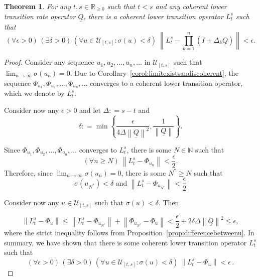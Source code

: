 \documentclass[10pt]{paper}
\newtheorem{theorem}{Theorem}
\newcommand{\nats}{\mathbb{N}}
\newcommand{\reals}{\mathbb{R}}
\newcommand{\realsnonneg}{\reals_{\geq 0}}
\newcommand{\lbound}{L}
\newcommand{\lrate}{\underline{Q}}
\newcommand{\norm}[1]{\left\lVert #1 \right\rVert}
\newcommand{\coloneqq}{:\!=}
\begin{document}
\begin{theorem}\label{theo:convergencelowerbound}
For any $t,s\in\realsnonneg$ such that $t<s$ and any coherent lower transition rate operator $\lrate$, there is a coherent lower transition operator $\lbound_t^s$ such that 
\begin{equation*}
(\forall\epsilon>0)\,
(\exists\delta>0)\,
(\forall u\in\mathcal{U}_{[t,s]}\colon\sigma(u)<\delta)~\norm{\lbound_t^s - \prod_{k=1}^n(I+\Delta_k\lrate)}<\epsilon.
\end{equation*}
\end{theorem}
\begin{proof}
Consider any sequence $u_1,u_2,\dots,u_n,\dots$ in $\mathcal{U}_{[t,s]}$ such that $\lim_{n\to\infty}\sigma(u_n)=0$. Due to Corollary~\ref{corol:limitexistsandiscoherent}, the sequence $\Phi_{u_1},\Phi_{u_2},\dots,\Phi_{u_n},\dots$ converges to a coherent lower transition operator, which we denote by $\lbound_t^s$. 

Consider now any $\epsilon>0$ and let $\Delta\coloneqq s-t$ and
\begin{equation*}
\delta\coloneqq\min\left\{\frac{\epsilon}{4\Delta\norm{\lrate}^2},\frac{1}{\norm{\lrate}}\right\}.
\end{equation*}

\noindent Since $\Phi_{u_1},\Phi_{u_2},\dots,\Phi_{u_n},\dots$ converges to $\lbound_t^s$, there is some $N\in\nats$ such that
\begin{equation*}
(\forall n\geq N)~\norm{\lbound_t^s - \Phi_{u_n}}<\frac{\epsilon}{2}.
\end{equation*}
Therefore, since $\lim_{n\to\infty}\sigma(u_n)=0$, there is some $N^*\geq N$ such that
\begin{equation*}
\sigma(u_{N^*})<\delta\text{ and }\norm{\lbound_t^s - \Phi_{u_{N^*}}}<\frac{\epsilon}{2}
\end{equation*}

\noindent Consider now any $u\in\mathcal{U}_{[t,s]}$ such that $\sigma(u)<\delta$. Then

\begin{equation*}
\norm{\lbound_t^s - \Phi_u}\leq\norm{\lbound_t^s-\Phi_{u_{N^*}}}
+\norm{\Phi_{u_{N^*}}-\Phi_u}
<\frac{\epsilon}{2}+2\delta\Delta\norm{\lrate}^2\leq\epsilon,
\end{equation*}
where the strict inequality follows from Proposition~\ref{prop:differencebetweenu}.
In summary, we have shown that there is some coherent lower transition operator $\lbound_t^s$ such that
\begin{equation*}
(\forall\epsilon>0)\,
(\exists\delta>0)\,
(\forall u\in\mathcal{U}_{[t,s]}\colon\sigma(u)<\delta)~\norm{\lbound_t^s - \Phi_u}<\epsilon\,.
\end{equation*}
\end{proof}
\end{document}

